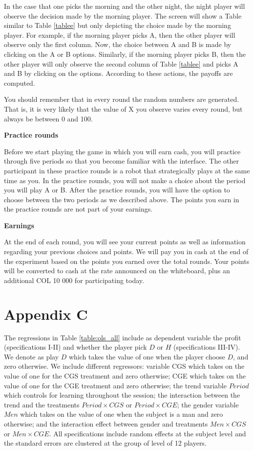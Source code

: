 \documentclass[12pt, letterpaper]{article}
\theoremstyle{plain}
\begin{document}
In the case that one picks the morning and the other night, the night player will observe the decision made by the morning player. The screen will show a Table similar to Table \ref{tablee} but only depicting the choice made by the morning player. For example, if the morning player picks A, then the other player will observe only the first column. Now, the choice between A and B is made by clicking on the A or B options. Similarly, if the morning player picks B, then the other player will only observe the second column of Table \ref{tablee} and picks A and B by clicking on the options. According to these actions, the payoffs are computed. 

You should remember that in every round the random numbers are generated. That is, it is very likely that the value of X you observe varies every round, but always be between 0 and 100. 

\noindent \textbf{Practice rounds}

Before we start playing the game in which you will earn cash, you will practice through five periods so that you become familiar with the interface. The other participant in these practice rounds is a robot that strategically plays at the same time as you. In the practice rounds, you will not make a choice about the period you will play A or B. After the practice rounds, you will have the option to choose between the two periods as we described above. The points you earn in the practice rounds are not part of your earnings.


\noindent \textbf{Earnings}

At the end of each round, you will see your current points as well as information regarding your previous choices and points.  We will pay you in cash at the end of the experiment based on the points you earned over the total rounds. Your points will be converted to cash at the rate announced on the whiteboard, plus an additional COL 10 000 for participating today. 


\section*{ Appendix C}

The regressions in Table \ref{table:ols_all} include as dependent variable the profit (specifications I-II) and whether the player pick $D$ or $H$ (specifications III-IV). We denote as play $D$ which takes the value of one when the player choose $D$, and zero otherwise. We include different regressors: variable CGS which takes on the value of one for the CGS treatment and zero otherwise; CGE which takes on the value of one for the CGE treatment and zero otherwise; the trend variable $Period$ which controls for learning throughout the session; the interaction between the trend and the treatments $Period \times CGS$ or $Period \times CGE$; the gender variable $Men$ which takes on the value of one when the subject is a man and zero otherwise; and the interaction effect between gender and treatments $Men \times CGS$ or $Men \times CGE$. All specifications include random effects at the subject level and the standard errors are clustered at the group of level of 12 players.  
\end{document}
